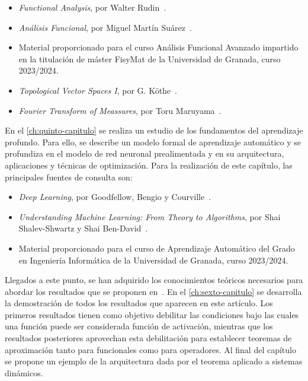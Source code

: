 \begin{itemize}
    \item \emph{Functional Analysis}, por Walter Rudin~\cite{rudin1991functional}.
    \item \emph{Análisis Funcional}, por Miguel Martín Suárez~\cite{martin2011analisis}.
    \item Material proporcionado para el curso Análisis Funcional Avanzado impartido en la titulación de máster FisyMat de la Universidad de Granada, curso 2023/2024.
    \item \emph{Topological Vector Spaces I}, por  G. Köthe~\cite{kothe1979topological}.
    \item \emph{Fourier Transform of Meassures}, por Toru Maruyama~\cite{Maruyama2018}.

     
    
\end{itemize}



En el \autoref{ch:quinto-capitulo} se realiza un estudio de los fundamentos del aprendizaje profundo. Para ello, se describe un modelo formal de  aprendizaje automático y se profundiza en el modelo de red neuronal prealimentada y en su arquitectura, aplicaciones y técnicas de optimización. Para la realización de este capítulo, las principales fuentes de consulta son: 

\begin{itemize}
    \item \emph{Deep Learning}, por Goodfellow, Bengio y Courville~\cite{goodfellow2016deep}.
    \item \emph{Understanding Machine Learning: From Theory to Algorithms}, por Shai Shalev-Shwartz y Shai Ben-David~\cite{shalev-shwartz2014understanding}.
    \item Material proporcionado para el curso de Aprendizaje Automático del Grado en Ingeniería Informática de la Universidad de Granada, curso 2023/2024. 

    
\end{itemize}

  
Llegados a este punto, se han adquirido los conocimientos teóricos necesarios para abordar los resultados que se proponen en~\cite{chen1995universal}. En el \autoref{ch:sexto-capitulo} se desarrolla la demostración de todos los resultados que aparecen en este artículo. Los primeros resultados tienen como objetivo debilitar las condiciones bajo las cuales una función puede ser considerada función de activación, mientras que los resultados posteriores aprovechan esta debilitación para establecer teoremas de aproximación tanto para funcionales como para operadores. Al final del capítulo se propone un ejemplo de la arquitectura dada por el teorema aplicado a sistemas dinámicos. 

